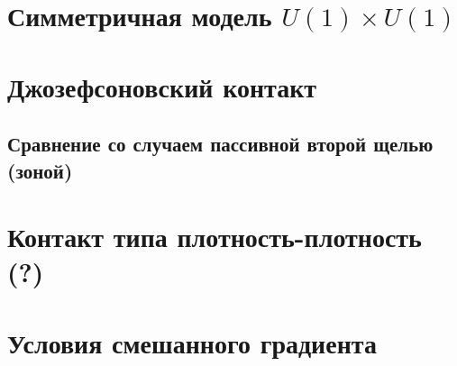 \section{Симметричная модель \texorpdfstring{$ U(1) \times U(1) $}
  {U(1) x U(1)}}
\label{sec:3-1}

\section{Джозефсоновский контакт}
\label{sec:3-2}

\subsection{Сравнение со случаем пассивной второй щелью (зоной)}
\label{subsec:3-2-1}

\section{Контакт типа плотность-плотность (?)}
\label{sec:3-3}

\section{Условия смешанного градиента}
\label{sec:3-4}
